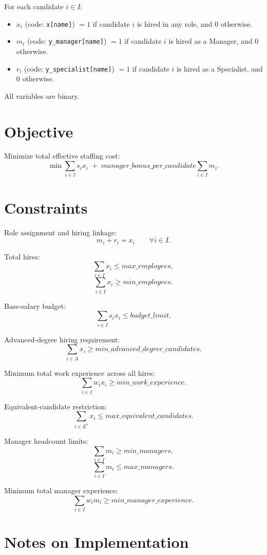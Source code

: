 For each candidate $i \in I$:
\begin{itemize}
    \item $x_i$ (code: \texttt{x[name]}) $=1$ if candidate $i$ is hired in any role, and $0$ otherwise.
    \item $m_i$ (code: \texttt{y\_manager[name]}) $=1$ if candidate $i$ is hired as a Manager, and $0$ otherwise.
    \item $r_i$ (code: \texttt{y\_specialist[name]}) $=1$ if candidate $i$ is hired as a Specialist, and $0$ otherwise.
\end{itemize}

All variables are binary.

\section*{Objective}

Minimize total effective staffing cost:
\[
\min \sum_{i\in I} s_i x_i
\;+\;
\textit{manager\_bonus\_per\_candidate}\sum_{i\in I} m_i.
\]

\section*{Constraints}

Role assignment and hiring linkage:
\[
m_i + r_i = x_i
\qquad \forall i \in I.
\]

Total hires:
\[
\sum_{i\in I} x_i \le \textit{max\_employees},
\]
\[
\sum_{i\in I} x_i \ge \textit{min\_employees}.
\]

Base-salary budget:
\[
\sum_{i\in I} s_i x_i \le \textit{budget\_limit}.
\]

Advanced-degree hiring requirement:
\[
\sum_{i\in A} x_i \ge \textit{min\_advanced\_degree\_candidates}.
\]

Minimum total work experience across all hires:
\[
\sum_{i\in I} w_i x_i \ge \textit{min\_work\_experience}.
\]

Equivalent-candidate restriction:
\[
\sum_{i\in E^\ast} x_i \le \textit{max\_equivalent\_candidates}.
\]

Manager headcount limits:
\[
\sum_{i\in I} m_i \ge \textit{min\_managers},
\]
\[
\sum_{i\in I} m_i \le \textit{max\_managers}.
\]

Minimum total manager experience:
\[
\sum_{i\in I} w_i m_i \ge \textit{min\_manager\_experience}.
\]

\section*{Notes on Implementation}

